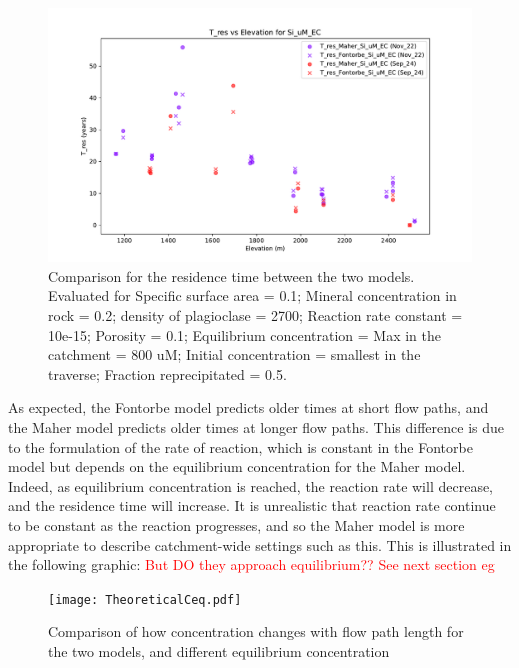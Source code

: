 \begin{figure}[h]
    \centering
    \includegraphics[width=\textwidth]{T_res_Si_uM_EC_comparison.pdf}
    \caption{Comparison for the residence time between the two models. Evaluated for Specific surface area = 0.1; Mineral concentration in rock = 0.2; density of plagioclase = 2700; Reaction rate constant = 10e-15; Porosity = 0.1; Equilibrium concentration = Max in the catchment = 800 uM; Initial concentration = smallest in the traverse; Fraction reprecipitated = 0.5.}
    \label{fig:discussion7}
\end{figure}

\FloatBarrier


As expected, the Fontorbe model predicts older times at short flow paths, and the Maher model predicts older times at longer flow paths. This difference is due to the formulation of the rate of reaction, which is constant in the Fontorbe model but depends on the equilibrium concentration for the Maher model. Indeed, as equilibrium concentration is reached, the reaction rate will decrease, and the residence time will increase. It is unrealistic that reaction rate continue to be constant as the reaction progresses, and so the Maher model is more appropriate to describe catchment-wide settings such as this. This is illustrated in the following graphic: \textcolor{red}{But DO they approach equilibrium?? See next section eg}

\begin{figure}[h]
    \centering
    \texttt{[image: TheoreticalCeq.pdf]}
    \caption{Comparison of how concentration changes with flow path length for the two models, and different equilibrium concentration}
    \label{fig:discussion8}
\end{figure}

\FloatBarrier



